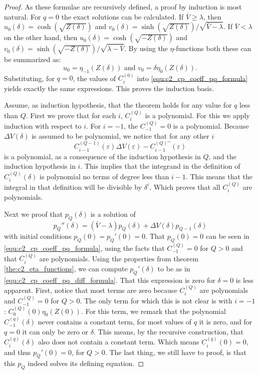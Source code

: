 \begin{proof}
As these formulae are recursively defined, a proof by induction is most natural. For $q=0$ the exact solutions can be calculated. If $\bar{V} \geq \lambda$, then $u_0(\delta) = \cosh(\sqrt{Z(\delta)})$ and $v_0(\delta) = \sinh(\sqrt{Z(\delta)})/\sqrt{\bar{V} - \lambda}$. If $\bar{V} < \lambda$ on the other hand, then $u_0(\delta) = \cosh(\sqrt{-Z(\delta)})$ and $v_0(\delta) = \sinh(\sqrt{-Z(\delta)})/\sqrt{\lambda - \bar{V}}$. By using the $\eta$-functions both these can be summarized as:
$$ u_0 = \eta_{-1}(Z(\delta)) \text{ and } v_0 = \delta\eta_{0}(Z(\delta))\text{.}$$
Substituting, for $q=0$, the values of $C^{(0)}_i$ into \eqref{equ:c2_cp_coeff_pq_formula} yields exactly the same expressions. This proves the induction basis.

Assume, as induction hypothesis, that the theorem holds for any value for $q$ less than $Q$. First we prove that for each $i$, $C_i^{(Q)}$ is a polynomial. For this we apply induction with respect to $i$. For $i = -1$, the $C^{(Q)}_{-1} =0$ is a polynomial. Because $\Delta V(\delta)$ is assumed to be polynomial, we notice that for any other $i$
$$
    C_{i-1}^{(Q-1)}(\varepsilon) \Delta V(\varepsilon) - C_{i-1}^{(Q)\prime\prime}(\varepsilon)
$$
is a polynomial, as a consequence of the induction hypothesis in $Q$, and the induction hypothesis in $i$. This implies that the integrand in the definition of $C_i^{(Q)}(\delta)$ is polynomial no terms of degree less than $i-1$. This means that the integral in that definition will be divisible by $\delta^i$. Which proves that all $C_{i}^{(Q)}$ are polynomials.

Next we proof that $p_Q(\delta)$ is a solution of
$$
    p_Q''(\delta)  = (\bar{V} - \lambda) p_Q(\delta) + \Delta V(\delta) p_{Q-1}(\delta)
$$
with initial conditions $p_Q(0) = p_Q'(0) = 0$. That $p_Q(0) = 0$ can be seen in \eqref{equ:c2_cp_coeff_pq_formula}, using the facts that $C^{(Q)}_{-1} = 0$ for $Q > 0$ and that $C_i^{(Q)}$ are polynomials. Using the properties from theorem \ref{the:c2_eta_functions}, we can compute $p_Q'(\delta)$ to be as in \eqref{equ:c2_cp_coeff_pq_diff_formula}. That this expression is zero for $\delta = 0$ is less apparent. First, notice that most terms are zero because $C_i^{(Q)}$ are polynomials and $C^{(Q)}_{-1} = 0$ for $Q > 0$. The only term for which this is not clear is with $i = -1$: $C_0^{(Q)}(0)\eta_{0}(Z(0))$. For this term, we remark that the polynomial $C^{(q)}_{-1}(\delta)$ never contains a constant term, for most values of $q$ it is zero, and for $q=0$ it can only be zero or $\delta$. This means, by the recursive construction, that $C_{i}^{(q)}(\delta)$ also does not contain a constant term. Which means $C_{i}^{(q)}(0) = 0$, and thus $p_Q'(0) = 0$, for $Q > 0$. The last thing, we still have to proof, is that this $p_Q$ indeed solves its defining equation.


\end{proof}
